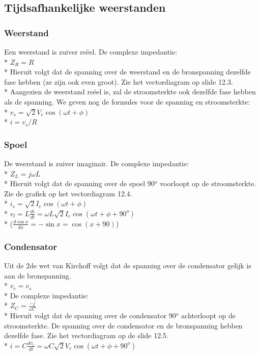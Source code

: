 \documentclass[10pt]{article}
\begin{document}
\subsection{Tijdsafhankelijke weerstanden}
\subsubsection{Weerstand}
Een weerstand is zuiver re\"eel. De complexe impedantie:\\*
$Z_R = R$\\*
Hieruit volgt dat de spanning over de weerstand en de bronspanning dezelfde fase hebben (ze zijn ook even groot). Zie het vectordiagram op slide 12.3.\\*
Aangezien de weerstand re\"eel is, zal de stroomsterkte ook dezelfde fase hebben als de spanning. We geven nog de formules voor de spanning en stroomsterkte:\\*
$v_s = \sqrt{2}V_e\cos{(\omega t + \phi)}$\\*
$i = v_s/R$
\subsubsection{Spoel}
De weerstand is zuiver imaginair. De complexe impedantie:\\*
$Z_L = j\omega L$\\*
Hieruit volgt dat de spanning over de spoel 90$^o$ voorloopt op de stroomsterkte. Zie de grafiek op het vectordiagram 12.4.\\*
$i_s = \sqrt{2}I_e\cos{(\omega t+ \phi)}$\\*
$v_l = L\frac{di}{dt} = \omega L\sqrt{2}I_e\cos{(\omega t+ \phi + 90^o)}$\\*
{\scriptsize ($\frac{d\cos{x}}{dx} = -\sin{x} = \cos{(x+90)}$)}
\subsubsection{Condensator}
Uit de 2de wet van Kirchoff volgt dat de spanning over de condensator gelijk is aan de bronspanning.\\*
$v_c = v_s$\\*
De complexe impedantie:\\*
$Z_C = \frac{-j}{\omega C}$\\*
Hieruit volgt dat de spanning over de condensator 90$^o$ achterloopt op de stroomsterkte. De spanning over de condensator en de bronspanning hebben dezelfde fase. Zie het vectordiagram op de slide 12.5.\\*
$i = C\frac{dv_c}{dt} = \omega C\sqrt{2}V_e\cos{(\omega t+\phi+90^o)}$
\end{document}

